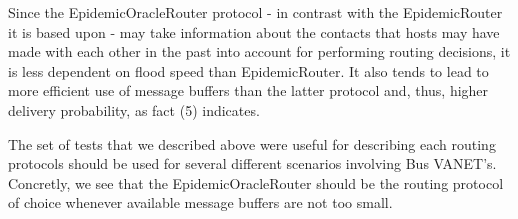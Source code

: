 Since the EpidemicOracleRouter protocol - in contrast with the EpidemicRouter
it is based upon - may take information about the contacts that hosts may have
made with each other in the past into account for performing routing decisions,
it is less dependent on flood speed than EpidemicRouter.  It also tends to lead
to more efficient use of message buffers than the latter protocol and, thus,
higher delivery probability, as fact (5) indicates.

The set of tests that we described above were useful for describing each
routing protocols should be used for several different scenarios involving
Bus VANET's. Concretly, we see that the EpidemicOracleRouter should be the
routing protocol of choice whenever available message buffers are not too small.
